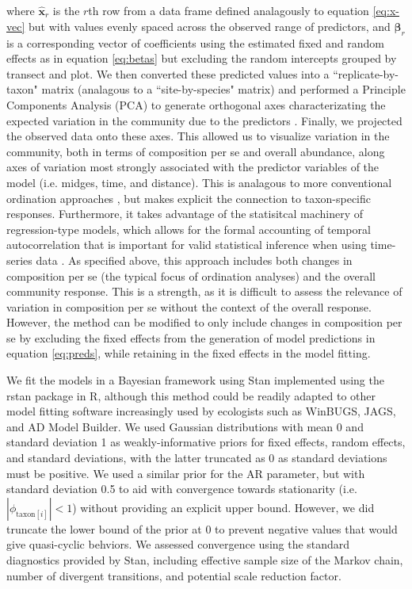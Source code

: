 \noindent where $\hat{\mathbf{x}}_r$ is the $r$th row from a data frame defined
analagously to equation \ref{eq:x-vec} but with values evenly spaced across the
observed range of predictors, and $\hat{{\boldsymbol\beta}}_r$ is a
corresponding vector of coefficients using the estimated fixed and random effects
as in equation \ref{eq:betas} but excluding the random intercepts grouped
by transect and plot. We then converted these predicted values into a
``replicate-by-taxon" matrix (analagous to a ``site-by-species" matrix)
and performed a Principle Components Analysis (PCA) to
generate orthogonal axes characterizating the expected
variation in the community due to the predictors \citep[similar to][]{Jackson2012}.
Finally, we projected the observed data onto these axes.
This allowed us to visualize variation in the community, both in terms of
composition per se and overall abundance, along axes of variation most
strongly associated with the predictor variables of the model
(i.e. midges, time, and distance).
This is analagous to more conventional ordination approaches \citep{Mcgarigal2013},
but makes explicit the connection to taxon-specific responses.
Furthermore, it takes advantage  of the statisitcal machinery of
regression-type models, which allows for the formal accounting of temporal
autocorrelation that is important for valid statistical inference when using
time-series data \citep{Ives2006}.
As specified above, this approach includes both changes in composition per se
(the typical focus of ordination analyses) and the overall community response.
This is a strength, as it is difficult to assess the relevance of variation in
composition per se without the context of the overall response.
However, the method can be modified to only include changes in composition
per se by excluding the fixed effects from the generation of model predictions
in equation \ref{eq:preds}, while retaining in the fixed effects in the model fitting.

We fit the models in a Bayesian framework using Stan \citep{Carpenter2017}
implemented using the rstan \citep{Stan2018} package in R,
although this method could be readily adapted to other model fitting software
increasingly used by ecologists such as WinBUGS, JAGS, and AD Model Builder.
We used Gaussian distributions with mean 0 and standard deviation 1 as
weakly-informative priors \citep{Gelman2017}
for fixed effects, random effects, and standard deviations,
with the latter truncated as 0 as standard deviations must be positive.
We used a similar prior for the AR parameter, but with standard deviation 0.5 to aid with
convergence towards stationarity (i.e. $|\phi_{\text{taxon}[i]}|<1$) without
providing an explicit upper bound.
However, we did truncate the lower bound of the prior at 0 to prevent negative
values that would give quasi-cyclic behviors.
We assessed convergence using the standard diagnostics provided by Stan,
including effective sample size of the Markov chain, number of divergent
transitions, and potential scale reduction factor.

